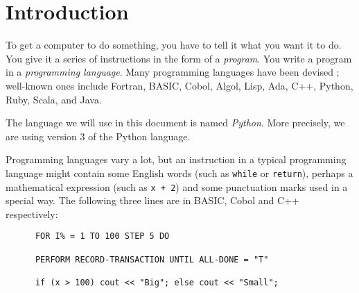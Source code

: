 \section{Introduction}





To get a computer to do something, you have to tell it what you want it
to do.  You give it a series of instructions in the form of a \emph{program}.
You write a program in a \emph{programming language}.
Many programming languages have been devised ;
well-known ones include
Fortran, BASIC, Cobol, Algol, Lisp, Ada, C++, Python, Ruby, Scala, and Java.


The language we will use in this document is named \emph{Python}.
More precisely, we are using version 3 of the Python language.

Programming languages vary a lot, but
an instruction in a typical programming language might contain
some English words (such as \verb!while! or \verb!return!), perhaps a mathematical
expression (such as \verb!x + 2!) and some punctuation marks used in a special way.
The following three lines are in BASIC, Cobol and C++ respectively:
\begin{Verbatim}
      FOR I% = 1 TO 100 STEP 5 DO

      PERFORM RECORD-TRANSACTION UNTIL ALL-DONE = "T"

      if (x > 100) cout << "Big"; else cout << "Small";
\end{Verbatim}

